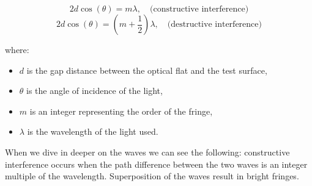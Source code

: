 \documentclass[../main.tex]{subfiles}
\begin{document}
\begin{minipage}{0.55\textwidth}
\begin{equation}
2d \cos(\theta) = m\lambda, \quad \text{(constructive interference)}
\end{equation}
\begin{equation}
2d \cos(\theta) = (m + \frac{1}{2})\lambda, \quad \text{(destructive interference)}
\end{equation}
\end{minipage}
\newline
\begin{minipage}{0.6\textwidth}
where:
\begin{itemize}
    \setlength{\itemsep}{0.1mm}
    \item \(d\) is the gap distance between the optical flat and the test surface,
    \item \(\theta\) is the angle of incidence of the light,
    \item \(m\) is an integer representing the order of the fringe,
    \item \(\lambda\) is the wavelength of the light used.
\end{itemize}


When we dive in deeper on the waves we can see the following: constructive interference occurs when the path difference between the two waves is an integer multiple of the wavelength. Superposition of the waves result in bright fringes. \cite{enwiki:1212101911}
\end{minipage}
\vspace{-5pt}
\end{document}
